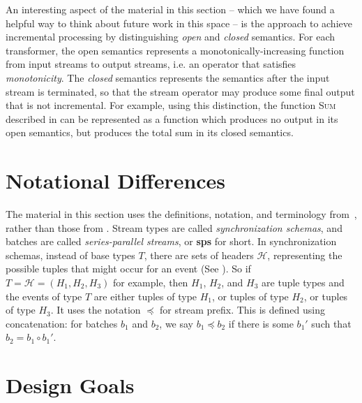 An interesting aspect of the material in this section -- which we have found a helpful way to think about future work in this space -- is the approach to achieve incremental processing by distinguishing \emph{open} and \emph{closed} semantics. For each transformer, the open semantics represents a monotonically-increasing function from input streams to output streams, i.e. an operator that satisfies \emph{monotonicity}. The \emph{closed} semantics represents the semantics after the input stream is terminated, so that the stream operator may produce some final output that is not incremental.
For example, using this distinction, the function \textsc{Sum} described in  can be represented as a function which produces no output in its open semantics, but produces the total sum in its closed semantics.

\section{Notational Differences}

The material in this section uses the definitions, notation, and terminology from~,
rather than those from .
Stream types are called \emph{synchronization schemas},
and batches are called \emph{series-parallel streams}, or \textbf{sps}
for short.
In synchronization schemas, instead of base types $T$, there are sets of headers $\mathcal{H}$, representing the possible tuples that might occur for an event
(See ).
So if $T = \mathcal{H} = (H_1, H_2, H_3)$ for example, then $H_1$, $H_2$, and $H_3$ are tuple types and the events of type $T$ are either tuples of type $H_1$, or tuples of type $H_2$, or tuples of type $H_3$.
It uses the notation $\preceq$ for stream prefix.
This is defined using concatenation:
for batches $b_1$ and $b_2$, we say $b_1 \preceq b_2$ if there is some $b_1'$ such that $b_2 = b_1 \circ b_1'$.

\section{Design Goals}

